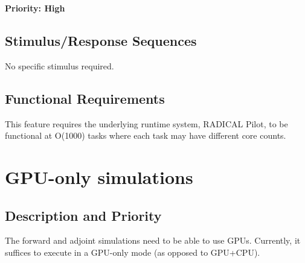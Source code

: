 \documentclass{scrreprt}
\begin{document}
\textbf{Priority: High}

\subsection{Stimulus/Response Sequences}

No specific stimulus required.

\subsection{Functional Requirements}


This feature requires the underlying runtime system, RADICAL Pilot, to be functional at O(1000) tasks where each task may have different core counts.

\section{GPU-only simulations}

\subsection{Description and Priority}

The forward and adjoint simulations need to be able to use GPUs. Currently, it suffices to execute in a GPU-only mode (as opposed to GPU+CPU).
\end{document}
